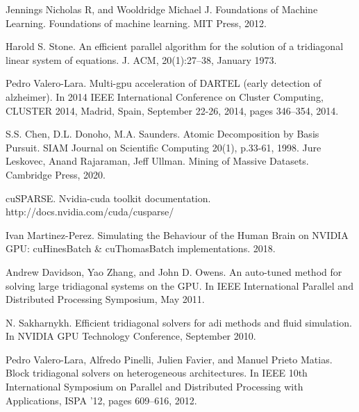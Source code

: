 \begin{thebibliography}{1}
  Jennings Nicholas R, and Wooldridge Michael J. Foundations of Machine Learning. Foundations of machine learning. MIT Press, 2012.

  Harold S. Stone. An efficient parallel algorithm for the solution of a tridiagonal linear system of
  equations. J. ACM, 20(1):27–38, January 1973.
  
  Pedro Valero-Lara. Multi-gpu acceleration of DARTEL (early detection of alzheimer). In 2014
  IEEE International Conference on Cluster Computing, CLUSTER 2014, Madrid, Spain, September
  22-26, 2014, pages 346–354, 2014.
  
  S.S. Chen, D.L. Donoho, M.A. Saunders. Atomic Decomposition by Basis Pursuit. SIAM Journal on Scientific Computing 20(1), p.33-61, 1998.
  Jure Leskovec, Anand Rajaraman, Jeff Ullman. Mining of Massive Datasets. Cambridge Press, 2020.

  cuSPARSE. Nvidia-cuda toolkit documentation.
  http://docs.nvidia.com/cuda/cusparse/

  Ivan Martinez-Perez. Simulating the Behaviour of the Human Brain on NVIDIA GPU:
cuHinesBatch \& cuThomasBatch implementations. 2018.

  Andrew Davidson, Yao Zhang, and John D. Owens. An auto-tuned method for
solving large tridiagonal systems on the GPU. In IEEE International Parallel and
Distributed Processing Symposium, May 2011.

  N. Sakharnykh. Efficient tridiagonal solvers for adi methods and fluid simulation.
  In NVIDIA GPU Technology Conference, September 2010.

  Pedro Valero-Lara, Alfredo Pinelli, Julien Favier, and Manuel Prieto Matias. Block
tridiagonal solvers on heterogeneous architectures. In IEEE 10th International
Symposium on Parallel and Distributed Processing with Applications, ISPA ’12,
pages 609–616, 2012.
  \end{thebibliography}